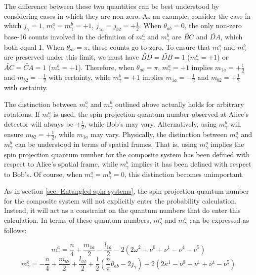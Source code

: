 \documentclass{article}
\begin{document}
The difference between these two quantities can be best understood by considering cases in which they are non-zero. As an example, consider the case in which $j_\gamma=1$, $m^a_\gamma=m^b_\gamma=+1$, $j_{1a}=j_{b2}=+\frac{1}{2}$. When $\theta_{ab}=0$, the only non-zero base-16 counts involved in the definition of $m^a_\gamma$ and $m^b_\gamma$ are $\widetilde{BC}$ and $\widetilde{DA}$, which both equal 1. When $\theta_{ab}=\pi$, these counts go to zero. To ensure that $m^a_\gamma$ and $m^b_\gamma$ are preserved under this limit, we must have $\widetilde{BD}=\widetilde{DB}=1$ ($m^a_\gamma=+1$) or $\widetilde{AC}=\widetilde{CA}=1$ ($m^b_\gamma=+1$). Therefore, when $\theta_{ab}=\pi$, $m^a_\gamma=+1$ implies $m_{1a}=+\frac{1}{2}$ and $m_{b2}=-\frac{1}{2}$ with certainty, while $m^b_\gamma=+1$ implies $m_{1a}=-\frac{1}{2}$ and $m_{b2}=+\frac{1}{2}$ with certainty.

The distinction between $m^a_\gamma$ and $m^b_\gamma$ outlined above actually holds for arbitrary rotations. If $m^a_\gamma$ is used, the spin projection quantum number observed at Alice's detector will always be $+\frac{1}{2}$, while Bob's may vary. Alternatively, using $m^b_\gamma$ will ensure $m_{b2}=+\frac{1}{2}$, while $m_{1a}$ may vary. Physically, the distinction between $m^a_\gamma$ and $m^b_\gamma$ can be understood in terms of spatial frames. That is, using $m^a_\gamma$ implies the spin projection quantum number for the composite system has been defined with respect to Alice's spatial frame, while $m^b_\gamma$ implies it has been defined with respect to Bob's. Of course, when $m^a_\gamma=m^b_\gamma=0$, this distinction becomes unimportant. 

As in section \ref{sec: Entangled spin systems}, the spin projection quantum number for the composite system will not explicitly enter the probability calculation. Instead, it will act as a constraint on the quantum numbers that do enter this calculation. In terms of these quantum numbers, $m^a_\gamma$ and $m^b_\gamma$ can be expressed as follows:

\begin{equation}
    m^a_\gamma = \frac{n}{4}+\frac{m_{1a}}{2}-\frac{l_{1a}}{2}-2(2\omega^2+\nu^0+\nu^1-\nu^4-\nu^5)
    \label{eq: m_gamma alice alt}
\end{equation}
\begin{equation}
    m^b_\gamma = -\frac{n}{4}+\frac{m_{b2}}{2}+\frac{l_{b2}}{2}+\frac{1}{2}(\frac{n}{\pi}\theta_{ab}-2j_\gamma)+2(2\kappa^1-\nu^0+\nu^1+\nu^4-\nu^5)
    \label{eq: m_gamma bob alt}
\end{equation}
\end{document}
